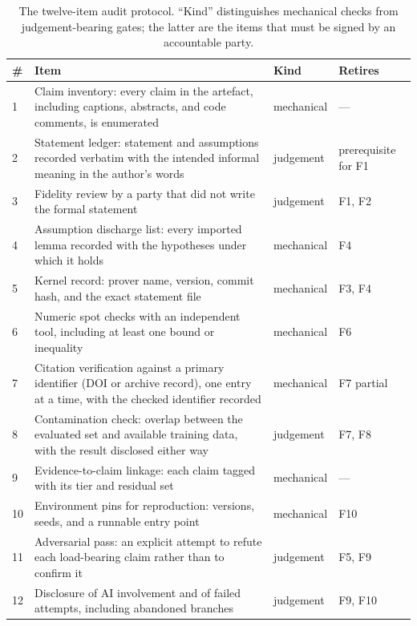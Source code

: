 \documentclass[11pt]{article}
\theoremstyle{plain}
\theoremstyle{definition}
\begin{document}
\begin{table}[t]
\centering
\small
\caption{The twelve-item audit protocol. ``Kind'' distinguishes mechanical checks from
judgement-bearing gates; the latter are the items that must be signed by an accountable party.}
\label{tab:protocol}
\begin{tabular}{@{}p{0.6cm}p{7.5cm}p{1.9cm}p{3.0cm}@{}}
\toprule
\# & Item & Kind & Retires \\
\midrule
1 & Claim inventory: every claim in the artefact, including captions, abstracts, and code
comments, is enumerated & mechanical & --- \\
2 & Statement ledger: statement and assumptions recorded verbatim with the intended informal
meaning in the author's words & judgement & prerequisite for F1 \\
3 & Fidelity review by a party that did not write the formal statement & judgement & F1, F2 \\
4 & Assumption discharge list: every imported lemma recorded with the hypotheses under which it
holds & mechanical & F4 \\
5 & Kernel record: prover name, version, commit hash, and the exact statement file & mechanical
& F3, F4 \\
6 & Numeric spot checks with an independent tool, including at least one bound or inequality
& mechanical & F6 \\
7 & Citation verification against a primary identifier (DOI or archive record), one entry at a
time, with the checked identifier recorded & mechanical & F7 partial \\
8 & Contamination check: overlap between the evaluated set and available training data, with the
result disclosed either way & judgement & F7, F8 \\
9 & Evidence-to-claim linkage: each claim tagged with its tier and residual set & mechanical
& --- \\
10 & Environment pins for reproduction: versions, seeds, and a runnable entry point & mechanical
& F10 \\
11 & Adversarial pass: an explicit attempt to refute each load-bearing claim rather than to
confirm it & judgement & F5, F9 \\
12 & Disclosure of AI involvement and of failed attempts, including abandoned branches
& judgement & F9, F10 \\
\bottomrule
\end{tabular}
\end{table}
\end{document}
